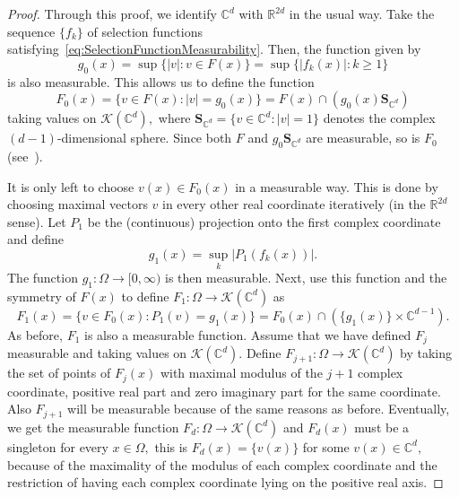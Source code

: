 \documentclass{article}
\theoremstyle{definition}
\theoremstyle{remark}
\numberwithin{equation}{section}
\newcommand{\cK}{\mathcal{K}}
\newcommand{\reals}{\mathbb{R}}
\newcommand{\complex}{\mathbb{C}}
\newcommand{\1}{\mathbf{1}}
\newcommand{\complexsphere}[1]{\mathbf{{S}}_{\complex^{{#1}}}}
\begin{document}
    \begin{proof}
        Through this proof, we identify $\complex^d$ with $\reals^{2d}$
        in the usual way.
        Take the sequence $\{f_k\}$ of selection functions satisfying~\eqref{eq:SelectionFunctionMeasurability}.
        Then, the function given by
        \begin{equation*}
            g_0(x) = \sup\{|v|\colon v \in F(x)\} = \sup\{|f_k(x)|\colon k \geq 1\}
        \end{equation*}
        is also measurable.
        This allows us to define the function
        \begin{equation*}
            F_0(x) = \{v \in F(x)\colon |v| = g_0(x)\} = F(x) \cap (g_0(x)\complexsphere{d})
        \end{equation*}
        taking values on $\cK(\complex^d),$
        where $\complexsphere{d} = \{v \in \complex^d\colon |v| = 1\}$ denotes the complex
        $(d-1)$-dimensional sphere.
        Since both $F$ and $g_0 \complexsphere{d}$ are measurable, so is $F_0$
        (see~\cite[Theorems~8.2.2 and~8.2.4]{Aubin_2009}).

        It is only left to choose $v(x) \in F_0(x)$ in a measurable way.
        This is done by choosing maximal vectors $v$ in every other real coordinate iteratively (in the $\reals^{2d}$ sense).
        Let $P_1$ be the (continuous) projection onto the first complex coordinate and define
        \begin{equation*}
            g_1(x) = \sup_k |P_1(f_k(x))|.
        \end{equation*}
        The function $g_1\colon \Omega \rightarrow [0,\infty)$ is then measurable.
        Next, use this function and the symmetry of $F(x)$ to define $F_1\colon \Omega \rightarrow \cK(\complex^d)$ as
        \begin{equation*}
            F_1(x) = \{v \in F_0(x)\colon P_1(v) = g_1(x)\}
                   = F_0(x) \cap (\{g_1(x)\} \times \complex^{d-1}).
        \end{equation*}
        As before, $F_1$ is also a measurable function.
        Assume that we have defined $F_j$ measurable and taking values on $\cK(\complex^d).$
        Define $F_{j+1}\colon \Omega \rightarrow \cK(\complex^d)$ by taking the set of points
        of $F_j(x)$ with maximal modulus of the $j+1$ complex coordinate, positive real part and zero imaginary part for the same coordinate.
        Also $F_{j+1}$ will be measurable because of the same reasons as before.
        Eventually, we get the measurable function $F_d\colon \Omega \rightarrow \cK(\complex^d)$ and $F_d(x)$ must be a singleton for every $x \in \Omega,$
        this is $F_d(x) =\{v(x)\}$ for some $v(x) \in \complex^d,$
        because of the maximality of the modulus of each complex coordinate
        and the restriction of having each complex coordinate lying on the positive real axis.
    \end{proof}
\end{document}
